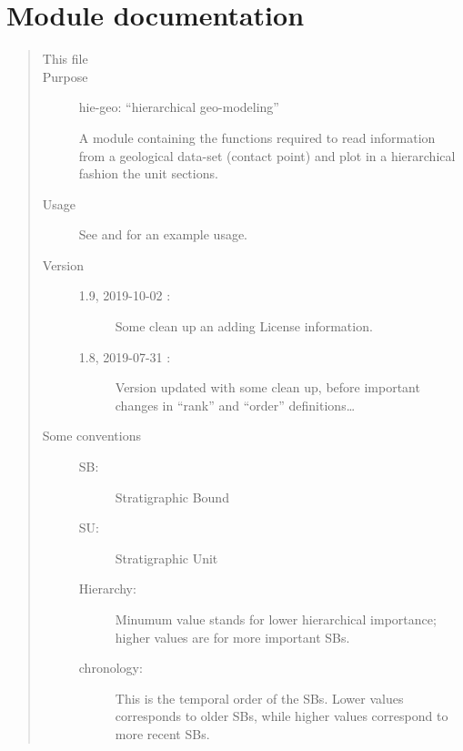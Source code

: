 \documentclass[letterpaper,10pt,english]{sphinxmanual}
\begin{document}
\chapter{Module documentation}
\label{\detokenize{hiegeo:module-hiegeo}}\label{\detokenize{hiegeo:module-documentation}}\label{\detokenize{hiegeo::doc}}\begin{quote}\begin{description}
\item[{This file}] \leavevmode
{}

\item[{Purpose}] \leavevmode
hie-geo: “hierarchical geo-modeling”

A module containing the functions required to read information
from a geological data-set (contact point) and plot in a
hierarchical fashion the unit sections.

\item[{Usage}] \leavevmode
See  and  for an example usage.

\item[{Version}] \leavevmode\begin{description}
\item[{1.9, 2019-10-02 :}] \leavevmode
Some clean up an adding License information.

\item[{1.8, 2019-07-31 :}] \leavevmode
Version updated with some clean up, before important changes in “rank” 
and “order” definitions…

\end{description}

\item[{Some conventions}] \leavevmode\begin{description}
\item[{SB:}] \leavevmode
Stratigraphic Bound

\item[{SU:}] \leavevmode
Stratigraphic Unit

\item[{Hierarchy:}] \leavevmode
Minumum value stands for lower hierarchical importance;  higher
values are for more important SBs.

\item[{chronology:}] \leavevmode
This is the temporal order of the SBs. Lower values corresponds to older
SBs, while higher values correspond to more recent SBs.


\end{description}
\end{description}
\end{quote}
\end{document}

